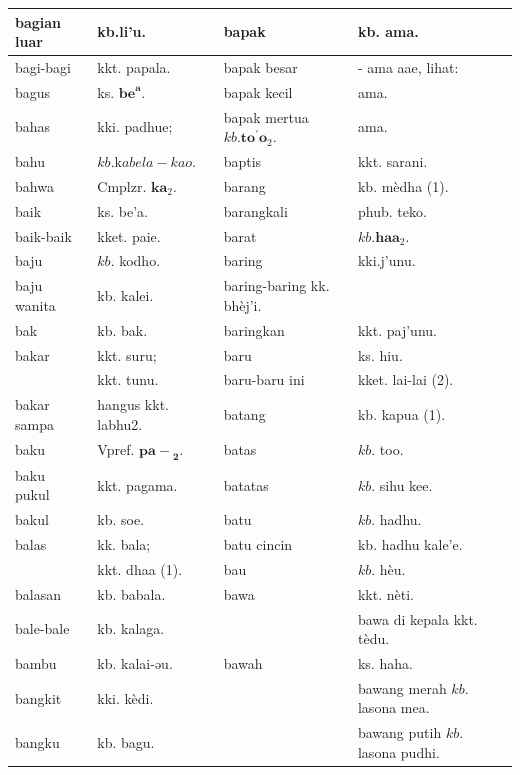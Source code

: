 \documentclass[10pt]{article}
\begin{document}
\begin{center}
\begin{tabular}{|l|l|l|l|}
\hline
bagian luar & kb.li'u. & bapak & kb. ama. \\
\hline
bagi-bagi & kkt. papala. & bapak besar & - ama aae, lihat: \\
\hline
bagus & ks. \(\mathbf{b e}^{\mathbf{a}}\). & bapak kecil & ama. \\
\hline
bahas & kki. padhue; & bapak mertua \(k b . \mathbf{t o}^{\prime} \mathbf{o}_{2}\). & ama. \\
\hline
bahu & \(k b . \mathrm{k} a b e l a-k a o\). & baptis & kkt. sarani. \\
\hline
bahwa & Cmplzr. \(\mathbf{k a}_{2}\). & barang & kb. mèdha (1). \\
\hline
baik & ks. be'a. & barangkali & phub. teko. \\
\hline
baik-baik & kket. paie. & barat & \(k b . \mathbf{h a a}_{2}\). \\
\hline
baju & \(k b\). kodho. & baring & kki.j'unu. \\
\hline
baju wanita & kb. kalei. & baring-baring kk. bhèj'i. &  \\
\hline
bak & kb. bak. & baringkan & kkt. paj'unu. \\
\hline
bakar & kkt. suru; & baru & ks. hiu. \\
\hline
 & kkt. tunu. & baru-baru ini & kket. lai-lai (2). \\
\hline
bakar sampa & hangus kkt. labhu2. & batang & kb. kapua (1). \\
\hline
baku & Vpref. \(\mathbf{p a -}_{\mathbf{2}}\). & batas & \(k b\). too. \\
\hline
baku pukul & kkt. pagama. & batatas & \(k b\). sihu kee. \\
\hline
bakul & kb. soe. & batu & \(k b\). hadhu. \\
\hline
balas & kk. bala; & batu cincin & kb. hadhu kale'e. \\
\hline
 & kkt. dhaa (1). & bau & \(k b\). hèu. \\
\hline
balasan & kb. babala. & bawa & kkt. nèti. \\
\hline
bale-bale & kb. kalaga. &  & bawa di kepala kkt. tèdu. \\
\hline
bambu & kb. kalai-əu. & bawah & ks. haha. \\
\hline
bangkit & kki. kèdi. &  & bawang merah \(k b\). lasona mea. \\
\hline
bangku & kb. bagu. &  & bawang putih \(k b\). lasona pudhi. \\

\end{tabular}
\end{center}
\end{document}
